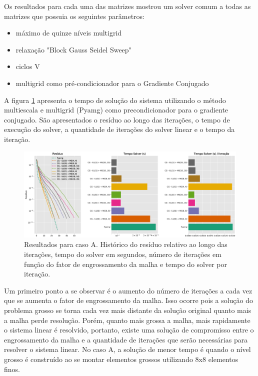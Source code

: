 Os resultados para cada uma das matrizes mostrou um solver comum a todas as matrizes que possuia os seguintes parâmetros:

\begin{itemize}
    \item máximo de quinze níveis multigrid
    \item relaxação "Block Gauss Seidel Sweep" 
    \item ciclos V
    \item multigrid como pré-condicionador para o Gradiente Conjugado
\end{itemize}

A figura \ref{fig:reservatorio100x100_1} apresenta o tempo de solução do sistema utilizando o método multiescala e multigrid (Pyamg) como precondicionador para o gradiente conjugado. São apresentados o resíduo ao longo das iterações, o tempo de execução do solver, a quantidade de iterações do solver linear e o tempo da iteração.

\begin{figure}[!htbp]
\label{fig:reservatorio100x100_1}
\centering
\includegraphics[width=\textwidth]{chap08/figs/reservatorio100x100_1.eps}
\caption{Resultados para caso A. Histórico do resíduo relativo ao longo das iterações, tempo do solver em segundos, número de iterações em função do fator de engrossamento da malha e tempo do solver por iteração. }
\end{figure}

Um primeiro ponto a se observar é o aumento do número de iterações a cada vez que se aumenta o fator de engrossamento da malha. Isso ocorre pois a solução do problema grosso se torna cada vez mais distante da solução  original quanto mais a malha perde resolução. Porém, quanto mais grossa a malha, mais rapidamente o sistema linear é resolvido, portanto, existe uma solução de compromisso entre o engrossamento da malha e a quantidade de iterações que serão necessárias para resolver o sistema linear. No caso A, a solução de menor tempo é quando o nível grosso é construído ao se montar elementos grossos utilizando 8x8 elementos finos. 


